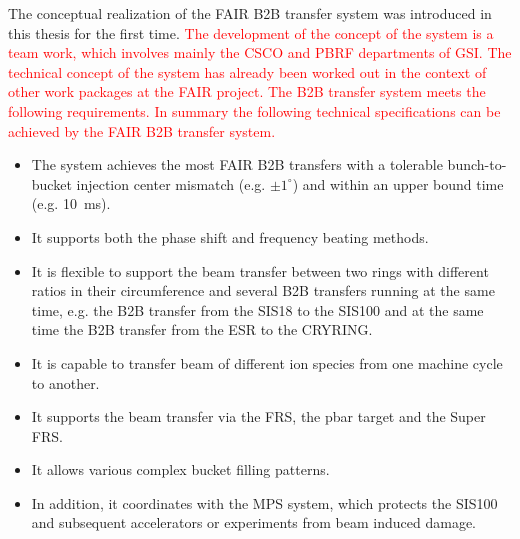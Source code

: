 
The conceptual realization of the FAIR B2B transfer system was introduced in this thesis for the first time. \textcolor{red}{The development of the concept of the system is a team work, which involves mainly the CSCO and PBRF departments of GSI. The technical concept of the system has already been worked out in the context of other work packages at the FAIR project. The B2B transfer system meets the following requirements. In summary the following technical specifications can be achieved by the FAIR B2B transfer system.} 
\begin{itemize}
	\item The system achieves the most FAIR B2B transfers with a tolerable bunch-to-bucket injection center mismatch (e.g. $\pm 1^\circ$) and within an upper bound time (e.g. \SI{10}{\ms}). 
	\item It supports both the phase shift and frequency beating methods. 
	\item It is flexible to support the beam transfer between two rings with different ratios in their circumference and several B2B transfers running at the same time, e.g. the B2B transfer from the SIS18 to the SIS100 and at the same time the B2B transfer from the ESR to the CRYRING. 
	\item It is capable to transfer beam of different ion species from one machine cycle to another.
	\item It supports the beam transfer via the FRS, the pbar target and the Super FRS. 
	\item It allows various complex bucket filling patterns. 
	\item In addition, it coordinates with the MPS system, which protects the SIS100 and subsequent accelerators or experiments from beam induced damage. 
\end{itemize}


